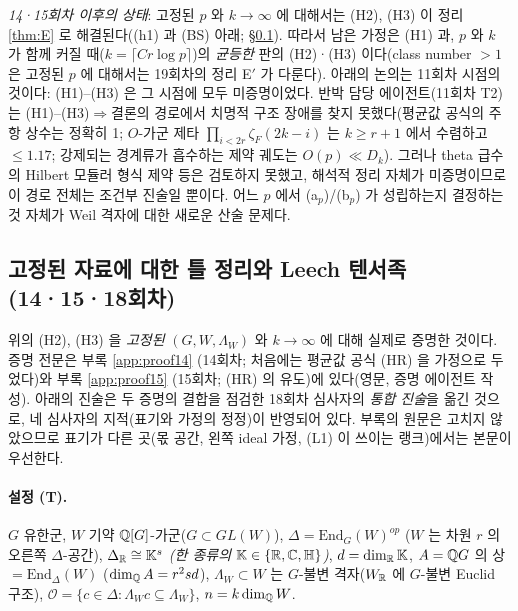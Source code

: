 \emph{14·15회차 이후의 상태}: 고정된 $p$ 와 $k\to\infty$ 에 대해서는 (H2), (H3) 이 정리 \ref{thm:E} 로 해결된다((h1) 과 (BS) 아래; \S\ref{sec:leechthm}). 따라서 남은 가정은 (H1) 과, $p$ 와 $k$ 가 함께 커질 때($k=\lceil Cr\log p\rceil$)의 \emph{균등한} 판의 (H2)·(H3) 이다(class number $>1$ 은 고정된 $p$ 에 대해서는 19회차의 정리 E$'$ 가 다룬다). 아래의 논의는 11회차 시점의 것이다: (H1)--(H3) 은 그 시점에 모두 미증명이었다. 반박 담당 에이전트(11회차 T2)는 (H1)--(H3)$\Rightarrow$결론의 경로에서 치명적 구조 장애를 찾지 못했다(평균값 공식의 주항 상수는 정확히 1; $O$-가군 제타 $\prod_{i<2r}\zeta_F(2k-i)$ 는 $k\ge r+1$ 에서 수렴하고 $\le1.17$; 강제되는 경계류가 흡수하는 제약 궤도는 $O(p)\ll D_k$). 그러나 theta 급수의 Hilbert 모듈러 형식 제약 등은 검토하지 못했고, 해석적 정리 자체가 미증명이므로 이 경로 전체는 조건부 진술일 뿐이다. 어느 $p$ 에서 (a$_p$)/(b$_p$) 가 성립하는지 결정하는 것 자체가 Weil 격자에 대한 새로운 산술 문제다.

\subsection{고정된 자료에 대한 틀 정리와 Leech 텐서족 (14·15·18회차)}\label{sec:leechthm}
위의 (H2), (H3) 을 \emph{고정된} $(G,W,\Lambda_W)$ 와 $k\to\infty$ 에 대해 실제로 증명한 것이다. 증명 전문은 부록 \ref{app:proof14} (14회차; 처음에는 평균값 공식 (HR) 을 가정으로 두었다)와 부록 \ref{app:proof15} (15회차; (HR) 의 유도)에 있다(영문, 증명 에이전트 작성). 아래의 진술은 두 증명의 결합을 점검한 18회차 심사자의 \emph{통합 진술}을 옮긴 것으로, 네 심사자의 지적(표기와 가정의 정정)이 반영되어 있다. 부록의 원문은 고치지 않았으므로 표기가 다른 곳(몫 공간, 왼쪽 ideal 가정, (L1) 이 쓰이는 랭크)에서는 본문이 우선한다.

\paragraph{설정 (T).} $G$ 유한군, $W$ 기약 $\mathbb{Q}[G]$-가군($G\subset GL(W)$), $\Delta=\mathrm{End}_G(W)^{op}$ ($W$ 는 차원 $r$ 의 오른쪽 $\Delta$-공간), \emph{$\Delta_{\mathbb{R}}\cong\mathbb K^s$ (한 종류의 $\mathbb K\in\{\mathbb{R},\mathbb{C},\mathbb{H}\}$)}, $d=\dim_{\mathbb{R}}\mathbb K$, $A=\mathbb{Q} G$ 의 상 $=\mathrm{End}_\Delta(W)$ ($\dim_{\mathbb{Q}} A=r^2sd$), $\Lambda_W\subset W$ 는 $G$-불변 격자($W_{\mathbb{R}}$ 에 $G$-불변 Euclid 구조), $\mathcal O=\{c\in\Delta:\Lambda_Wc\subseteq\Lambda_W\}$, $n=k\dim_{\mathbb{Q}} W$.

